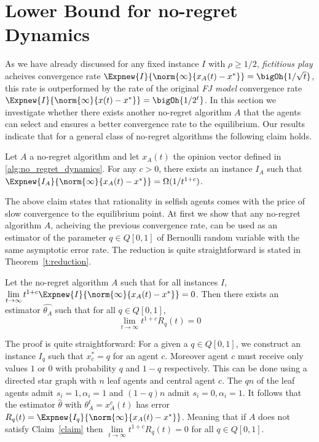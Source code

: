 \section{Lower Bound for no-regret Dynamics}\label{s:lower_bound}
As we have already discussed for any fixed instance $I$ with $\rho\geq 1/2$, \emph{fictitious play} acheives 
convergence rate $\Expnew{I}{\norm{\infty}{x_A(t)-x^*}}=\bigOh{1/\sqrt{t}}$, this rate is outperformed by
the rate of the original \emph{FJ model} convergence rate $\Expnew{I}{\norm{\infty}{x(t)-x^*}}=\bigOh{1/2^{t}}$. 
In this section we investigate whether there exists another no-regret algorithm $A$ that the agents can select
and ensures a better convergence rate to the equilibrium. Our results indicate that for a general class of no-regret
algorithms the following claim holds.

\begin{claim}\label{claim}
Let $A$ a no-regret algorithm and let $x_A(t)$ the opinion vector defined in \ref{alg:no_regret_dynamics}.
For any $c>0$, there exists an instance $I_A$ such that $\Expnew{I_A}{\norm{\infty}{x_A(t)-x^*}} = \Omega(1/t^{1+c})$.
\end{claim}


The above claim states that rationality in selfish agents comes with the price of slow convergence to the equilibrium point.
At first we show that any no-regret algorithm $A$, acheiving the previous convergence rate, can be used as an 
estimator of the parameter $q \in Q[0,1]$ of Bernoulli random variable with the same asymptotic error rate. The reduction
is quite straightforward is stated in Theorem~\ref{t:reduction}.
\begin{theorem}\label{t:reduction}
Let the no-regret algorithm $A$ such that for all instances $I$, $\lim \limits_{t \rightarrow \infty} t^{1+c} \Expnew{I}{\norm{\infty}{x_A(t)-x^*}}=0$.
Then there exists an estimator $\hat{\theta_A}$ such that for all  $q \in Q[0,1]$, \[\lim_{t \rightarrow \infty}t^{1+c}R_q(t)=0\]
\end{theorem}

The proof is quite straightforward: For a given a $q \in Q[0,1]$, we 
construct an instance $I_q$ such that $x_c^*=q$ for an agent $c$. Moreover agent $c$ must receive
only values $1$ or $0$ with probability $q$ and $1-q$ respectively. This can be done using a directed star graph with $n$ leaf agents 
and central agent $c$. The $qn$ of the leaf agents admit $s_i=1,\alpha_i=1$ and $(1-q)n$ admit $s_i=0,\alpha_i=1$. 
It follows that the estimator $\hat{\theta}$ with $\theta_A^t = x_A^c(t)$ has error $R_q(t)=\Expnew{I_q}{\norm{\infty}{x_A(t)-x^*}}$.
Meaning that if $A$ does not satisfy Claim~\ref{claim} then $\lim\limits_{t \rightarrow \infty}t^{1+c}R_q(t)=0$ for all $q \in Q[0,1]$.


